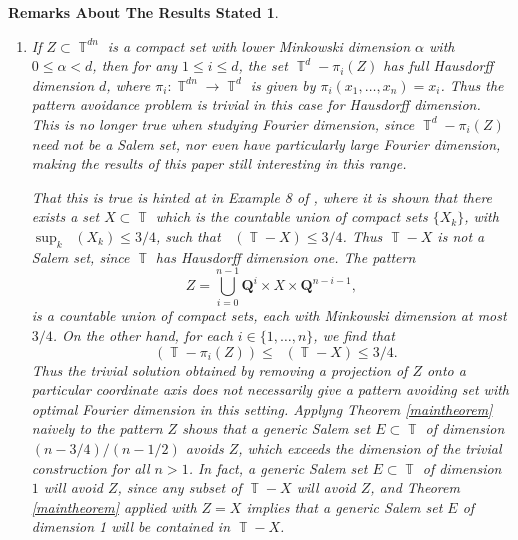 \documentclass[dvipsnames,letterpaper,12pt]{article}
\numberwithin{equation}{section}
\DeclareMathOperator{\minkdim}{\dim_{\mathbb{M}}}
\DeclareMathOperator{\fordim}{\dim_{\mathbb{F}}}
\DeclareMathOperator{\TT}{\mathbb{T}}
\newtheorem*{remarksaboutresults}{Remarks About The Results Stated}
\numberwithin{theorem}{section}
\begin{document}
\begin{remarksaboutresults}
\begin{enumerate}
        \item If $Z \subset \TT^{dn}$ is a compact set with lower Minkowski dimension $\alpha$ with $0 \leq \alpha < d$, then for any $1 \leq i \leq d$, the set $\TT^d - \pi_i(Z)$ has full Hausdorff dimension $d$, where $\pi_i: \TT^{dn} \to \TT^d$ is given by $\pi_i(x_1,\dots,x_n) = x_i$. Thus the pattern avoidance problem is trivial in this case for Hausdorff dimension. This is no longer true when studying Fourier dimension, since $\TT^d - \pi_i(Z)$ need not be a Salem set, nor even have particularly large Fourier dimension, making the results of this paper still interesting in this range.

        That this is true is hinted at in Example 8 of \cite{Ekstrom2014}, where it is shown that there exists a set $X \subset \TT$ which is the countable union of compact sets $\{ X_k \}$, with $\sup_k \minkdim(X_k) \leq 3/4$, such that $\fordim(\TT - X) \leq 3/4$. Thus $\TT - X$ is not a Salem set, since $\TT$ has Hausdorff dimension one. The pattern
        \[ Z = \bigcup_{i = 0}^{n-1} \mathbf{Q}^i \times X \times \mathbf{Q}^{n-i-1}, \]
        is a countable union of compact sets, each with Minkowski dimension at most $3/4$. On the other hand, for each $i \in \{ 1, \dots, n \}$, we find that
        \[ \fordim(\TT - \pi_i(Z)) \leq \fordim(\TT - X) \leq 3/4. \]
        Thus the trivial solution obtained by removing a projection of $Z$ onto a particular coordinate axis does not necessarily give a pattern avoiding set with optimal Fourier dimension in this setting. Applyng Theorem \ref{maintheorem} naively to the pattern $Z$ shows that a generic Salem set $E \subset \TT$ of dimension $(n-3/4)/(n-1/2)$ avoids $Z$, which exceeds the dimension of the trivial construction for all $n > 1$. In fact, a generic Salem set $E \subset \TT$ of dimension $1$ will avoid $Z$, since any subset of $\TT - X$ will avoid $Z$, and Theorem \ref{maintheorem} applied with $Z = X$ implies that a generic Salem set $E$ of dimension 1 will be contained in $\TT - X$.




\end{enumerate}
\end{remarksaboutresults}
\end{document}
